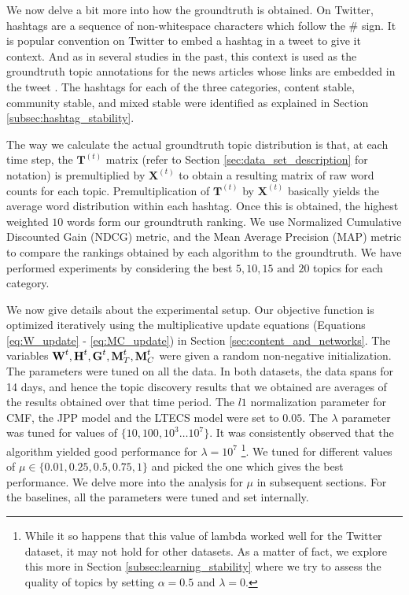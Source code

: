 We now delve a bit more into how the groundtruth is obtained.  On Twitter, hashtags are a sequence of non-whitespace
characters which follow the \# sign.  It is popular convention on Twitter to embed a hashtag
in a tweet to give it context.
And as in several studies in the past, this context is used as the groundtruth topic annotations for
the news articles whose links are embedded in the tweet \cite{Tsur:2012}. 
The hashtags for each of the three categories, content stable,
community stable, and mixed stable were identified as explained in Section \ref{subsec:hashtag_stability}.

The way we calculate
the actual groundtruth topic distribution is that, 
at each time step, the $\mathbf{T}^{(t)}$
matrix (refer to Section \ref{sec:data_set_description} for notation) is premultiplied by $\mathbf{X}^{(t)}$
to obtain a resulting matrix of raw word counts for each topic.  Premultiplication of $\mathbf{T}^{(t)}$
by $\mathbf{X}^{(t)}$ basically yields the average word distribution within each hashtag.  
Once this is obtained, the highest weighted $10$ words form our groundtruth ranking.  We use
Normalized Cumulative Discounted Gain (NDCG) metric, and the Mean Average Precision (MAP) metric
to compare the rankings obtained by each algorithm to the groundtruth.  We have performed
experiments by considering the best $5,10,15 \text{ and } 20$ topics for each category.  

We now give details about the experimental setup.  Our objective function is optimized
iteratively using the multiplicative update equations (Equations \ref{eq:W_update} - \ref{eq:MC_update})
in Section \ref{sec:content_and_networks}.  The variables $\textbf{W}^t, \textbf{H}^t, \textbf{G}^t, \textbf{M}^t_T, \textbf{M}^t_C$ were given
a random non-negative initialization.  The parameters were tuned on all
the data.  In both datasets, the data spans for 14 days, and hence the topic discovery results that
we obtained are averages of the results obtained over that time period.
The $l1$ normalization parameter for CMF, the JPP model and the LTECS model were set to $0.05$.
The $\lambda$ parameter was tuned for values of $\{10, 100, 10^3 \ldots 10^7\}$.  It was consistently
observed that the algorithm yielded good performance for $\lambda = 10^7$
\footnote{While it so happens that this value of lambda worked well for the Twitter dataset, it may
not hold for other datasets.  As a matter of fact, we explore this more in Section \ref{subsec:learning_stability}
where we try to assess the quality of topics by setting $\alpha = 0.5$ and $\lambda = 0$.}.
We tuned for different values of $\mu \in \{0.01, 0.25, 0.5, 0.75, 1\}$ and picked the one which gives the best performance.
We delve more into the analysis for $\mu$ in subsequent sections.  For the baselines, all the parameters
were tuned and set internally.
